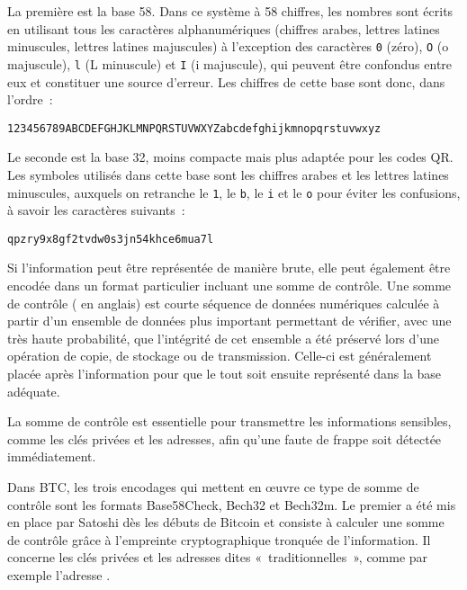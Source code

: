 La première est la base 58. Dans ce système à 58 chiffres, les nombres sont écrits en utilisant tous les caractères alphanumériques (chiffres arabes, lettres latines minuscules, lettres latines majuscules) à l'exception des caractères \texttt{0} (zéro), \texttt{O} (o majuscule), \texttt{l} (L minuscule) et \texttt{I} (i majuscule), qui peuvent être confondus entre eux et constituer une source d'erreur. Les chiffres de cette base sont donc, dans l'ordre~:

\begin{Verbatim}[fontsize=\small]
123456789ABCDEFGHJKLMNPQRSTUVWXYZabcdefghijkmnopqrstuvwxyz
\end{Verbatim}


Le seconde est la base 32, moins compacte mais plus adaptée pour les codes QR. Les symboles utilisés dans cette base sont les chiffres arabes et les lettres latines minuscules, auxquels on retranche le \texttt{1}, le \texttt{b}, le \texttt{i} et le \texttt{o} pour éviter les confusions, à savoir les caractères suivants~:

\begin{Verbatim}[fontsize=\small]
qpzry9x8gf2tvdw0s3jn54khce6mua7l
\end{Verbatim}


Si l'information peut être représentée de manière brute, elle peut également être encodée dans un format particulier incluant une somme de contrôle. Une somme de contrôle ( en anglais) est courte séquence de données numériques calculée à partir d'un ensemble de données plus important permettant de vérifier, avec une très haute probabilité, que l'intégrité de cet ensemble a été préservé lors d'une opération de copie, de stockage ou de transmission. Celle-ci est généralement placée après l'information pour que le tout soit ensuite représenté dans la base adéquate.

La somme de contrôle est essentielle pour transmettre les informations sensibles, comme les clés privées et les adresses, afin qu'une faute de frappe soit détectée immédiatement.

Dans BTC, les trois encodages qui mettent en œuvre ce type de somme de contrôle sont les formats Base58Check, Bech32 et Bech32m. Le premier a été mis en place par Satoshi dès les débuts de Bitcoin et consiste à calculer une somme de contrôle grâce à l'empreinte cryptographique tronquée de l'information. Il concerne les clés privées et les adresses dites «~traditionnelles~», comme par exemple l'adresse .

